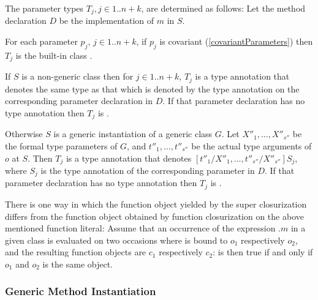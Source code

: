 \documentclass[makeidx]{article}
\begin{document}
{\LMHash{}%
The parameter types $T_j, j \in 1 .. n+k$, are determined as follows:
Let the method declaration $D$ be the implementation of $m$ in $S$.

\LMHash{}%
For each parameter $p_j$, $j \in 1 .. n+k$, if $p_j$ is covariant
(\ref{covariantParameters})
then $T_j$ is the built-in class .


\LMHash{}%
If $S$ is a non-generic class then for $j \in 1 .. n+k$,
$T_j$ is a type annotation that denotes the same type as that
which is denoted by the type annotation on the corresponding parameter declaration in $D$.
If that parameter declaration has no type annotation then $T_j$ is \DYNAMIC{}.

\LMHash{}%
Otherwise $S$ is a generic instantiation of a generic class $G$.
Let $X''_1, \ldots, X''_{s''}$ be the formal type parameters of $G$,
and $t''_1, \ldots, t''_{s''}$ be the actual type arguments of $o$ at $S$.
Then $T_j$ is a type annotation that denotes $[t''_1/X''_1, \ldots, t''_{s''}/X''_{s''}]S_j$,
where $S_j$ is the type annotation of the corresponding parameter in $D$.
If that parameter declaration has no type annotation then $T_j$ is \DYNAMIC{}.

\LMHash{}%
There is one way in which
the function object yielded by the super closurization differs from
the function object obtained by function closurization on the above mentioned function literal:
Assume that an occurrence of the expression \SUPER{}.$m$ in a given class
is evaluated on two occasions where \THIS{} is bound to $o_1$ respectively $o_2$,
and the resulting function objects are $c_1$ respectively $c_2$:
 is then true if and only if $o_1$ and $o_2$ is the same object.


\subsubsection{Generic Method Instantiation}


}
\end{document}
